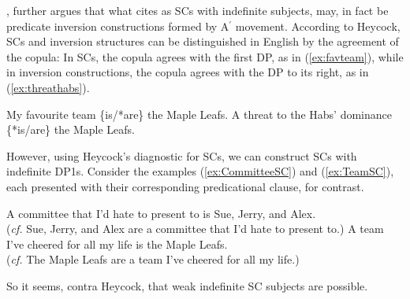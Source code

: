 \documentclass[
]{RCL}
\begin{document}
%
%
%
%
\citet{heycock2012specification}, further argues that what \citet{mikkelsen2005copular} cites as SCs with indefinite subjects, may, in fact be predicate inversion constructions formed by A$^{\prime}$ movement.
According to Heycock, SCs and inversion structures can be distinguished in English by the agreement of the copula:
In SCs, the copula agrees with the first DP, as in (\ref{ex:favteam}), while in inversion constructions, the copula agrees with the DP to its right, as in (\ref{ex:threathabs}).
\begin{exe}
	\ex My favourite team \{is/*are\} the Maple Leafs.\label{ex:favteam}
	\ex A threat to the Habs' dominance \{*is/are\} the Maple Leafs.\label{ex:threathabs}
\end{exe}
However, using Heycock's diagnostic for SCs, we can construct SCs with indefinite DP1s.
Consider the examples (\ref{ex:CommitteeSC}) and (\ref{ex:TeamSC}), each presented with their corresponding predicational clause, for contrast.
\begin{exe}
	\ex\label{ex:CommitteeSC} A committee that I'd hate to present to is Sue, Jerry, and Alex.\\
(\textit{cf.} Sue, Jerry, and Alex are a committee that I'd hate to present to.)
	\ex\label{ex:TeamSC} A team I've cheered for all my life is the Maple Leafs.\\
(\textit{cf.} The Maple Leafs are a team I've cheered for all my life.)
\end{exe}
So it seems, contra Heycock, that weak indefinite SC subjects are possible.
\end{document}
